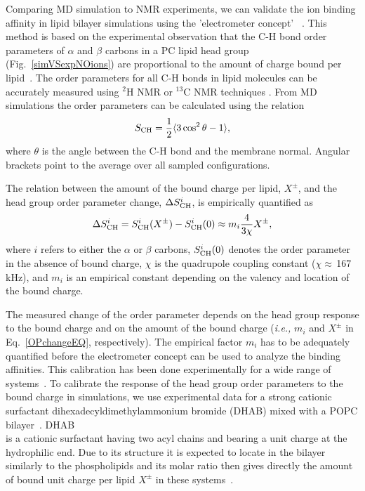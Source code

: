 Comparing MD simulation to NMR experiments, we can validate the ion 
binding affinity in lipid bilayer simulations using the 'electrometer concept'~ \citep{seelig87, catte16}. 
This method is based on the experimental observation that the C-H bond order parameters of $\alpha$ and $\beta$ carbons in a PC lipid head group (Fig.~\ref{simVSexpNOions}) are proportional to the amount of charge bound per lipid~\citep{seelig87}. 
The order parameters for all C-H bonds in lipid molecules can be accurately measured using $^2$H NMR or $^{13}$C NMR techniques \citep{ollila16}. 
From MD simulations the order parameters can be calculated using the relation 
\begin{equation}\label{OP} 
S_{\rm CH}=\frac{1}{2}\langle 3\cos^2\theta -1 \rangle, 
\end{equation} 
where $\theta$ is the angle between the C-H bond and the membrane normal. 
Angular brackets point to the average over all sampled configurations. 
 
The relation between the amount of the bound charge per lipid, $X^\pm$, and the head group order parameter change, $\Delta S_{\rm{CH}}^{i}$, is empirically quantified as~\citep{seelig87,ferreira16} 
\begin{equation}\label{OPchangeEQ} 
\Delta S_{\rm{CH}}^{i}= S_{\rm{CH}}^{i}(X^\pm)-S_{\rm{CH}}^{i}(0) \approx m_i \frac{4 }{3\chi}X^\pm, 
\end{equation} 
where $i$ refers to either the $\alpha$ or $\beta$ carbons, $S_{\rm{CH}}^{i}(0)$ denotes the order parameter in the absence of bound charge, $\chi$ is the quadrupole coupling constant ($\chi \approx$\,167\,kHz), and $m_i$ is an empirical constant depending on the valency and location of the bound charge. 
 
 
The measured change of the order parameter depends on the head group response to the bound charge and on the amount of the bound charge (\textit{i.e.,} $m_i$ and $X^\pm$ in Eq.~\ref{OPchangeEQ}, respectively).  
The empirical factor $m_i$ has to be adequately quantified before the electrometer concept can be used to analyze the binding affinities. 
This calibration has been done experimentally for a wide range of systems~\citep{seelig87, beschiasvili91}. 
To calibrate the response of the head group order parameters to the bound charge in simulations, we use experimental data for a strong cationic surfactant dihexadecyldimethylammonium bromide  (DHAB) mixed with a POPC bilayer~\citep{scherer89}. DHAB\\[0.5cm] 
is a cationic surfactant having two acyl chains and bearing a unit charge at the hydrophilic end. 
Due to its structure it is expected to locate in the bilayer similarly to the phospholipids and its molar ratio then gives directly the amount of bound unit charge per lipid $X^\pm$ in these systems~\citep{scherer89}. 
 



